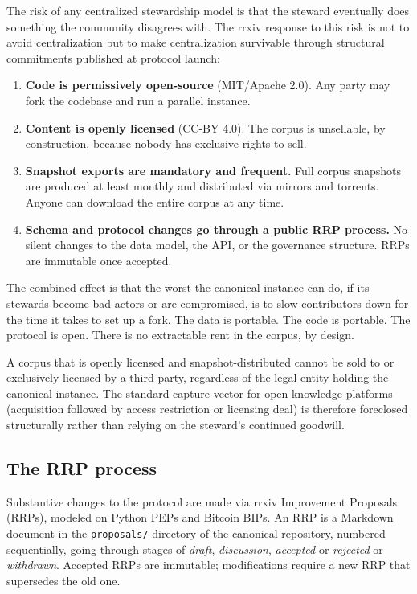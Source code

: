 \documentclass[11pt]{rrxiv}
\begin{document}
The risk of any centralized stewardship model is that the steward eventually does something the community disagrees with. The rrxiv response to this risk is not to avoid centralization but to make centralization survivable through structural commitments published at protocol launch:

\begin{enumerate}[leftmargin=2em, itemsep=0.3em]
\item \textbf{Code is permissively open-source} (MIT/Apache 2.0). Any party may fork the codebase and run a parallel instance.
\item \textbf{Content is openly licensed} (CC-BY 4.0). The corpus is unsellable, by construction, because nobody has exclusive rights to sell.
\item \textbf{Snapshot exports are mandatory and frequent.} Full corpus snapshots are produced at least monthly and distributed via mirrors and torrents. Anyone can download the entire corpus at any time.
\item \textbf{Schema and protocol changes go through a public RRP process.} No silent changes to the data model, the API, or the governance structure. RRPs are immutable once accepted.
\end{enumerate}

The combined effect is that the worst the canonical instance can do, if its stewards become bad actors or are compromised, is to slow contributors down for the time it takes to set up a fork. The data is portable. The code is portable. The protocol is open. There is no extractable rent in the corpus, by design.

\begin{claim}[title=Structural unsellability, type=theoretical, evidence=argument, labels={design-thesis}]
\label{claim:unsellability}
A corpus that is openly licensed and snapshot-distributed cannot be sold to or exclusively licensed by a third party, regardless of the legal entity holding the canonical instance. The standard capture vector for open-knowledge platforms (acquisition followed by access restriction or licensing deal) is therefore foreclosed structurally rather than relying on the steward's continued goodwill.
\end{claim}

\subsection{The RRP process}

Substantive changes to the protocol are made via rrxiv Improvement Proposals (RRPs), modeled on Python PEPs and Bitcoin BIPs. An RRP is a Markdown document in the \texttt{proposals/} directory of the canonical repository, numbered sequentially, going through stages of \emph{draft}, \emph{discussion}, \emph{accepted} or \emph{rejected} or \emph{withdrawn}. Accepted RRPs are immutable; modifications require a new RRP that supersedes the old one.
\end{document}
